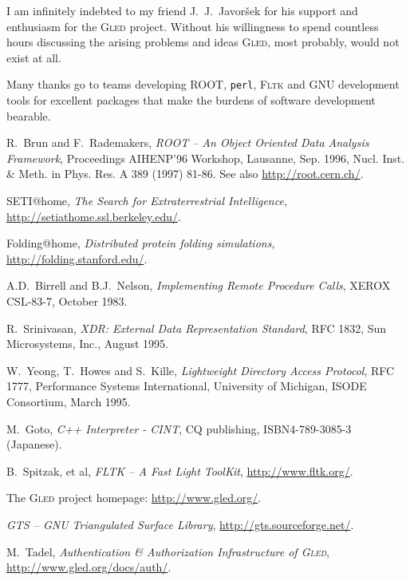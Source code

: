 \documentclass[a4paper,11pt]{article}
\def\gled{\textsc{Gled}\xspace}
\def\smalltt#1{{\small\texttt{#1}}}
\begin{document}
I am infinitely indebted to my friend J.~J.~Javor\v{s}ek for his
support and enthusiasm for the \gled project. Without his
willingness to spend countless hours discussing the arising problems
and ideas \gled, most probably, would not exist at all.

Many thanks go to teams developing ROOT, \smalltt{perl}, \textsc{Fltk}
and GNU development tools for excellent packages that make the burdens
of software development bearable.


\begin{thebibliography}{99}
  
 R.~Brun and F.~Rademakers, \emph{ROOT -- An Object
    Oriented Data Analysis Framework}, Proceedings AIHENP'96 Workshop,
  Lausanne, Sep. 1996, Nucl. Inst. \& Meth. in Phys. Res. A 389 (1997)
  81-86. See also \url{http://root.cern.ch/}.
  
 SETI@home, \emph{The Search for Extraterrestrial
    Intelligence}, \url{http://setiathome.ssl.berkeley.edu/}.
  
 Folding@home, \emph{Distributed protein folding
    simulations}, \url{http://folding.stanford.edu/}.

 A.D.~Birrell and B.J.~Nelson, \emph{Implementing Remote
    Procedure Calls}, XEROX CSL-83-7, October 1983.
      
 R.~Srinivasan, \emph{XDR: External Data Representation
    Standard}, RFC 1832, Sun Microsystems, Inc., August 1995.
        
 W.~Yeong, T.~Howes and S.~Kille, \emph{Lightweight
    Directory Access Protocol}, RFC 1777, Performance Systems
  International, University of Michigan, ISODE Consortium, March 1995.
  
 M.~Goto, \emph{C++ Interpreter - CINT}, CQ publishing,
  ISBN4-789-3085-3 (Japanese).

 B.~Spitzak, et al, \emph{FLTK -- A Fast Light ToolKit},
  \url{http://www.fltk.org/}.
  
 The \gled project homepage: \url{http://www.gled.org/}.
  
 \emph{GTS -- GNU Triangulated Surface Library},
  \url{http://gts.sourceforge.net/}.

 M.~Tadel, \emph{Authentication \& Authorization
  Infrastructure of \textsc{Gled}}, \url{http://www.gled.org/docs/auth/}.

\end{thebibliography}
\end{document}
